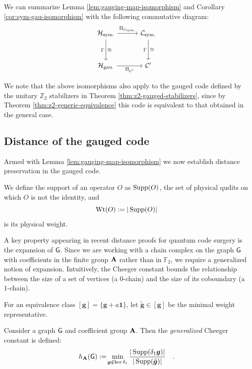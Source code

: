 \documentclass[11pt]{article}
\begin{document}
We can summarize Lemma \ref{lem:gauging-map-isomorphism} and Corollary \ref{cor:sym-gau-isomorphism} with the following commutative diagram:
\begin{equation}\label{eq:gauging_cube}
\begin{tikzcd}[row sep=3em, column sep=3em, ampersand replacement=\&]
\mathcal H_{\rm sym.}
    \arrow[r, "\Pi_{\cC_{\rm sym.}}"]
    \arrow[d, "\Gamma"', "\cong"]
\& \cC_{\rm sym.}
    \arrow[d, "\Gamma"', "\cong"]
\\
\mathcal H_{\rm gau.}
    \arrow[r, "\Pi_{\cC'}"']
\& \cC'
\end{tikzcd}
\end{equation}

\begin{remark}

We note that the above isomorphisms also apply to the gauged code defined by the unitary $\mathbb{Z}_2$ stabilizers in Theorem \ref{thm:z2-gauged-stabilizers}, since by Theorem \ref{thm:z2-generic-equivalence} this code is equivalent to that obtained in the general case. 
\end{remark}

\subsection{Distance of the gauged code}

Armed with Lemma \ref{lem:gauging-map-isomorphism} we now establish distance preservation in the gauged code.

We define the support of an operator $O$ as $\operatorname{Supp}(O)$, the set of physical qudits on which
$O$ is not the identity, and
\[
    \operatorname{Wt}(O):=|\operatorname{Supp}(O)|
\]
is its physical weight.

A key property appearing in recent distance proofs for quantum code surgery is the expansion of $\mathsf{G}$.
Since we are working with a chain complex on the graph $\mathsf{G}$ with coefficients in the finite group $\mathbf{A}$ rather than in $\mathbb{F}_2$, we require a generalized notion of expansion. Intuitively, the Cheeger constant bounds the relationship between the size of a set of vertices (a $0$-chain) and the size of its coboundary (a $1$-chain). 

For an equivalence class $[\bm{g}] = \{\bm{g} + a \bm{1}\}$, let $\tilde{\bm{g}} \in [\bm{g}]$ be the minimal weight representative.


\begin{definition}
\label{def:generalized-cheeger}
Consider a graph $\mathsf{G}$ and coefficient group $\mathbf{A}$. Then the \emph{generalized} Cheeger constant is defined:
\begin{equation}
    \begin{aligned}
    h_{\mathbf{A}}(\mathsf{G}):=
    &\min_{\bm g\notin\ker\delta_1}
    \frac{|\operatorname{Supp}(\delta_1\bm g)|}{|\operatorname{Supp}(\tilde{\bm g})|}
\end{aligned}.
\end{equation}
\end{definition}
\end{document}
